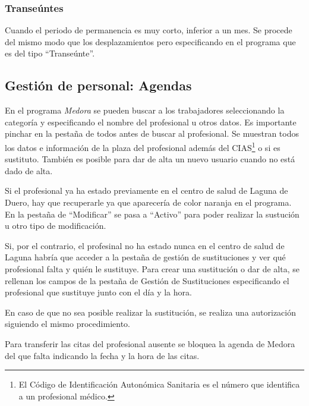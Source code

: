 \subsubsection{Transeúntes}

Cuando el periodo de permanencia es muy corto, inferior a un mes.
Se procede del mismo modo que los desplazamientos pero especificando en el programa que es del tipo ``Transeúnte''.

\subsection{Gestión de personal: Agendas}

En el programa \textit{Medora} se pueden buscar a los trabajadores seleccionando la categoría y especificando el nombre del profesional u otros datos.
Es importante pinchar en la pestaña de todos antes de buscar al profesional.
Se muestran todos los datos e información de la plaza del profesional además del CIAS\footnote{El Código de Identificación Autonómica Sanitaria es el número que identifica a un profesional médico.} o si es sustituto.
También es posible para dar de alta un nuevo usuario cuando no está dado de alta.

Si el profesional ya ha estado previamente en el centro de salud de Laguna de Duero, hay que recuperarle ya que aparecería de color naranja en el programa.
En la pestaña de ``Modificar'' se pasa a ``Activo'' para poder realizar la sustución u otro tipo de modificación.

Si, por el contrario, el profesinal no ha estado nunca en el centro de salud de Laguna habría que acceder a la pestaña de gestión de sustituciones y ver qué profesional falta y quién le sustituye.
Para crear una sustitución o dar de alta, se rellenan los campos de la pestaña de Gestión de Sustituciones especificando el profesional que sustituye junto con el día y la hora.

En caso de que no sea posible realizar la sustitución, se realiza una autorización siguiendo el mismo procedimiento.

Para transferir las citas del profesional ausente se bloquea la agenda de Medora del que falta indicando la fecha y la hora de las citas.


